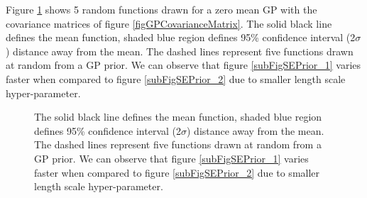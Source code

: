 Figure \ref{figGPPriors} shows 5 random functions drawn for a zero mean GP with the covariance matrices of figure \ref{figGPCovarianceMatrix}. The solid black line defines the mean function, shaded blue region defines 95\% confidence interval (2$\sigma$) distance away from the mean. The dashed lines represent five functions drawn at random from a GP prior. We can observe that figure \ref{subFigSEPrior_1} varies faster when compared to figure \ref{subFigSEPrior_2} due to smaller length scale hyper-parameter. 

\begin{figure}[!ht]
  \centering
    \quad
{}\quad
  
       \caption{The solid black line defines the mean function, shaded blue region defines 95\% confidence interval (2$\sigma$) distance away from the mean. The dashed lines represent five functions drawn at random from a GP prior. We can observe that figure \ref{subFigSEPrior_1} varies faster when compared to figure \ref{subFigSEPrior_2} due to smaller length scale hyper-parameter.       }\label{figGPPriors}
\end{figure}



